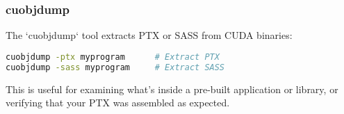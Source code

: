 \subsubsection{cuobjdump}

The `cuobjdump` tool extracts PTX or SASS from CUDA binaries:

\begin{lstlisting}[language=bash]
cuobjdump -ptx myprogram      # Extract PTX
cuobjdump -sass myprogram     # Extract SASS
\end{lstlisting}

This is useful for examining what's inside a pre-built application or library, or verifying that your PTX was assembled as expected.

